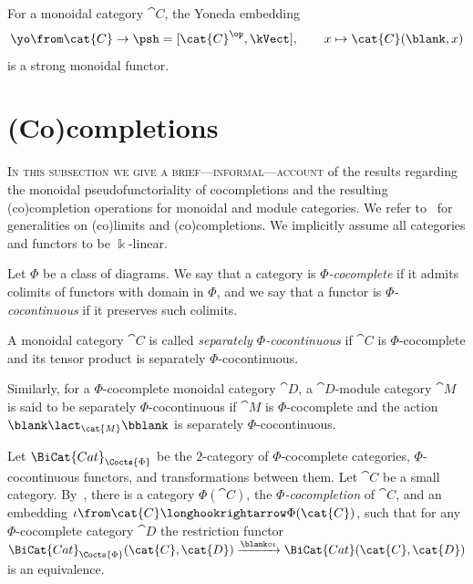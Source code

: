 \begin{proposition}\label{prop:yoneda-monoidal}
  For a monoidal category \(\cat{C}\),
  the Yoneda embedding
  \begin{equation}\label{eq:yoneda-embedding}
    \yo \from \cat{C} \to \psh = [\cat{C}^{\op}, \kVect], \qquad x \mapsto \cat{C}(\blank, x)
  \end{equation}
  is a strong monoidal functor.
\end{proposition}

\section{(Co)completions}

\textsc{In this subsection we give a brief—informal—account} of the results regarding the
monoidal pseudo\-functo\-riality of cocompletions
and the resulting (co)completion operations for monoidal and module categories.
We refer to~\cite{kelly05:basic,kashiwara06:categ} for generalities on (co)limits and (co)completions.
We implicitly assume all categories and functors to be \(\Bbbk\)\hyp{}linear.

Let \(\Phi\) be a class of diagrams.
We say that a category is \emph{\(\Phi\)\hyp{}cocomplete} if it admits colimits of functors with domain in \(\Phi\),
and we say that a functor is \emph{\(\Phi\)\hyp{}cocontinuous} if it preserves such colimits.

\begin{definition}\label{smoothcats}
  A monoidal category \(\cat{C}\) is called \emph{separately \(\Phi\)\hyp{}cocontinuous}
  if \(\cat{C}\) is \(\Phi\)\hyp{}cocomplete and its tensor product is separately \(\Phi\)\hyp{}cocontinuous.

  Similarly, for a \(\Phi\)\hyp{}cocomplete monoidal category \(\cat{D}\),
  a \(\cat{D}\)\hyp{}module category \(\cat{M}\) is said to be separately \(\Phi\)\hyp{}cocontinuous if \(\cat{M}\) is \(\Phi\)\hyp{}cocomplete
  and the action \(\blank \lact_{\cat{M}} \bblank\) is separately \(\Phi\)\hyp{}cocontinuous.
\end{definition}

Let \(\BiCat{Cat}_{\Cocts{\Phi}}\) be the \(2\)\hyp{}category of \(\Phi\)\hyp{}cocomplete categories,
\(\Phi\)\hyp{}cocontinuous functors,
and transformations between them.
Let \(\cat{C}\) be a small category.
By~\cite[Section~5.7]{kelly82:basic},
there is a category \(\Phi(\cat{C})\),
the \emph{\(\Phi\)\hyp{}cocompletion} of \(\cat{C}\),
and an embedding \(\iota\from \cat{C} \longhookrightarrow \Phi(\cat{C})\),
such that for any \(\Phi\)\hyp{}cocomplete category \(\cat{D}\)
the restriction functor \(\BiCat{Cat}_{\Cocts{\Phi}}(\cat{C},\cat{D}) \xrightarrow{\blank \circ \iota} \BiCat{Cat}(\cat{C},\cat{D})\) is an equivalence.

